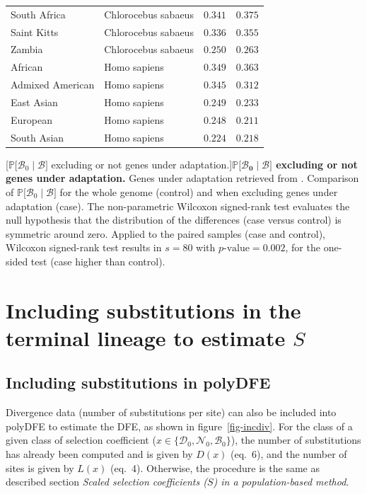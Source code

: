 \documentclass{article}
\newcommand{\proba}{\mathbb{P}}
\newcommand{\SphyDel}{\mathcal{D}_0}
\newcommand{\SphyNeu}{\mathcal{N}_0}
\newcommand{\SphyBen}{\mathcal{B}_0}
\newcommand{\Sphyclass}{x}
\newcommand{\given}{\mid}
\newcommand{\Spop}{S}
\newcommand{\SpopBen}{\mathcal{B}}
\newcommand{\pvalue}{p\text{-value}}
\begin{document}
\begin{center}
\begin{tabular}{|l|l|r|r|}
            \rowcolor{LIGHTGREY} South Africa & Chlorocebus sabaeus & $ 0.341$ & $ 0.375$ \\
            \rowcolor{LIGHTGREY} Saint Kitts & Chlorocebus sabaeus & $ 0.336$ & $ 0.355$ \\
            \rowcolor{LIGHTGREY} Zambia & Chlorocebus sabaeus & $ 0.250$ & $ 0.263$ \\
            African & Homo sapiens & $ 0.349$ & $ 0.363$ \\
            Admixed American & Homo sapiens & $ 0.345$ & $ 0.312$ \\
            East Asian & Homo sapiens & $ 0.249$ & $ 0.233$ \\
            European & Homo sapiens & $ 0.248$ & $ 0.211$ \\
            South Asian & Homo sapiens & $ 0.224$ & $ 0.218$ \\
            \bottomrule
        \end{tabular}
        [$\proba{[}\SphyBen\given \SpopBen {]}$ excluding or not genes under adaptation.]{\textbf{$\bm{\proba{[}\SphyBen\given \SpopBen {]}}$ excluding or not genes under adaptation.}
        Genes under adaptation retrieved from \textcite{latrille_genes_2023}.
        Comparison of $\proba{[}\SphyBen\given \SpopBen {]}$ for the whole genome (control) and when excluding genes under adaptation (case).
        The non-parametric Wilcoxon signed-rank test evaluates the null hypothesis that the distribution of the differences (case versus control) is symmetric around zero.
        Applied to the paired samples (case and control), Wilcoxon signed-rank test results in $s=80$ with $\pvalue=0.002$, for the one-sided test (case higher than control).\label{table:no-adaptation}}
    \end{center}

    \newpage

    \section{Including substitutions in the terminal lineage to estimate \texorpdfstring{$\Spop$}{S}}

    \subsection{Including substitutions in polyDFE}

    Divergence data (number of substitutions per site) can also be included into polyDFE to estimate the DFE, as shown in figure~\ref{fig-incdiv}.
    For the class of a given class of selection coefficient ($\Sphyclass \in \{\SphyDel, \SphyNeu, \SphyBen \}$), the number of substitutions has already been computed and is given by $D\left( \Sphyclass \right)$ (eq.~6), and the number of sites is given by $L \left( \Sphyclass \right)$ (eq.~4).
    Otherwise, the procedure is the same as described section \textit{Scaled selection coefficients ($\Spop$) in a population-based method}.
\end{document}
